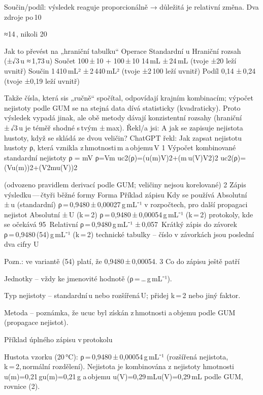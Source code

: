 {    Součin/podíl: výsledek reaguje proporcionálně → důležitá je relativní změna. Dva zdroje po 10 %

    ​≈14 , nikoli 20 %

Jak to převést na „hraniční tabulku“
Operace	Standardní u	Hraniční rozsah (±√3 u ≈ 1,73 u)
Součet 100 ± 10 + 100 ± 10	14 mL	± 24 mL (tvoje ±20 leží uvnitř)
Součin	1 410 mL²	± 2 440 mL² (tvoje ±2 100 leží uvnitř)
Podíl	0,14	± 0,24 (tvoje ±0,19 leží uvnitř)

Takže čísla, která sis „ručně“ spočítal, odpovídají krajním kombinacím; výpočet nejistoty podle GUM se na stejná data dívá statisticky (kvadraticky). Proto výsledek vypadá jinak, ale obě metody dávají konzistentní rozsahy (hraniční ± √3 u je téměř shodné s tvým ± max).
Řekl/a jsi:
A jak se zapisuje nejistota hustoty, když se skládá ze dvou veličin?
ChatGPT řekl:
Jak zapsat nejistotu hustoty ρ, která vznikla z hmotnosti m a objemu V
1  Výpočet kombinované standardní nejistoty
ρ  =  mV
ρ=Vm​
uc2(ρ)=(u(m)V)2+(m u(V)V2)2
uc2​(ρ)=(Vu(m)​)2+(V2mu(V)​)2

(odvozeno pravidlem derivací podle GUM; veličiny nejsou korelované)
2  Zápis výsledku — čtyři běžné formy
Forma	Příklad zápisu	Kdy se používá
Absolutní ± u (standardní)	ρ = 0,9480 ± 0,00027 g mL⁻¹	v rozpočtech, pro další propagaci nejistot
Absolutní ± U (k = 2)	ρ = 0,9480 ± 0,00054 g mL⁻¹ (k = 2)	protokoly, kde se očekává 95 %
Relativní	ρ = 0,9480 g mL⁻¹ ± 0,057 %
Krátký zápis do závorek	ρ = 0,9480 (54) g mL⁻¹ (k = 2)	technické tabulky – číslo v závorkách jsou poslední dva cifry U

Pozn.: ve variantě (54) platí, že 0,9480 ± 0,00054.
3  Co do zápisu ještě patří

    Jednotky – vždy ke jmenovité hodnotě (ρ = … g mL⁻¹).

    Typ nejistoty – standardní u nebo rozšířená U; přidej k = 2 nebo jiný faktor.

    Metoda – poznámka, že ucuc​ byl získán z hmotnosti a objemu podle GUM (propagace nejistot).

Příklad úplného zápisu v protokolu

    Hustota vzorku (20 °C):
    ρ = 0,9480 ± 0,00054 g mL⁻¹ (rozšířená nejistota, k = 2, normální rozdělení).
    Nejistota je kombinována z nejistoty hmotnosti u(m)=0,21 gu(m)=0,21 g a objemu u(V)=0,29 mLu(V)=0,29 mL podle GUM, rovnice (2).

}
